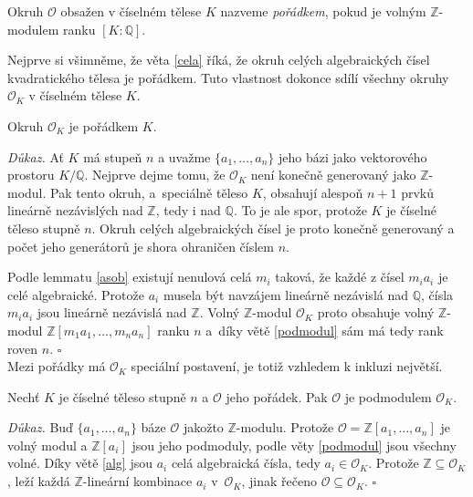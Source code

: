 \documentclass[12pt]{report}
\begin{document}
\begin{definice}
Okruh $\mathcal{O}$ obsažen v číselném tělese $K$ nazveme \textit{pořádkem}, pokud je volným $\mathbb{Z}$-modulem ranku $[K:\mathbb{Q}]$.
\end{definice}

Nejprve si všimněme, že věta \ref{cela} říká, že okruh celých algebraických čísel kvadratického tělesa je pořádkem. Tuto vlastnost dokonce sdílí všechny okruhy $\mathcal{O}_K$ v číselném tělese $K$.

\begin{veta}
Okruh $\mathcal{O}_K$ je pořádkem $K$.
\end{veta}
\noindent \textit{Důkaz.}  Ať $K$ má stupeň $n$ a uvažme $\lbrace a_1, \dots, a_n \rbrace$ jeho bázi jako vektorového prostoru $K/\mathbb{Q}$. Nejprve dejme tomu, že $\mathcal{O}_K$ není konečně generovaný jako $\mathbb{Z}$-modul. Pak tento okruh, a~speciálně těleso $K$, obsahují alespoň $n+1$ prvků lineárně nezávislých nad $\mathbb{Z}$, tedy i nad $\mathbb{Q}$. To je ale spor, protože $K$ je číselné těleso stupně $n$. Okruh celých algebraických čísel je proto konečně generovaný a počet jeho generátorů je shora ohraničen číslem $n$.

Podle lemmatu \ref{asob} existují nenulová celá $m_i$ taková, že každé z čísel $m_i a_i$ je celé algebraické. Protože $a_i$ musela být navzájem lineárně nezávislá nad $\mathbb{Q}$, čísla $m_i a_i$ jsou lineárně nezávislá nad $\mathbb{Z}$. Volný $\mathbb{Z}$-modul $\mathcal{O}_K$ proto obsahuje volný $\mathbb{Z}$-modul $\mathbb{Z}[m_1 a_1,\dots, m_n a_n]$ ranku $n$ a~díky větě \ref{podmodul} sám má tedy rank roven $n$. \hfill $\square$\\

Mezi pořádky má $\mathcal{O}_K$ speciální postavení, je totiž vzhledem k inkluzi největší.

\begin{veta}\label{podporadek}
Nechť $K$ je číselné těleso stupně $n$ a $\mathcal{O}$ jeho pořádek. Pak $\mathcal{O}$ je podmodulem $\mathcal{O}_K$.
\end{veta}

\noindent \textit{Důkaz.} Buď $\lbrace a_1, \dots,a_n \rbrace$ báze $\mathcal{O}$ jakožto $\mathbb{Z}$-modulu. Protože $\mathcal{O} = \mathbb{Z}[a_1,\dots,a_n]$ je volný modul a $\mathbb{Z}[a_i]$ jsou jeho podmoduly, podle věty \ref{podmodul} jsou všechny volné. Díky větě \ref{alg} jsou $a_i$ celá algebraická čísla, tedy $a_i \in \mathcal{O}_K$. Protože $\mathbb{Z} \subseteq \mathcal{O}_K$, leží každá $\mathbb{Z}$-lineární kombinace $a_i$ v~$\mathcal{O}_K$, jinak řečeno $\mathcal{O} \subseteq \mathcal{O}_K$. \hfill $\square$\\
\end{document}

